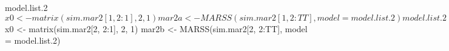 \begin{Schunk}
\begin{Sinput}
 model.list.2$x0 <- matrix(sim.mar2[1, 2:1], 2, 1)
 mar2a <- MARSS(sim.mar2[1, 2:TT], model = model.list.2)
 model.list.2$x0 <- matrix(sim.mar2[2, 2:1], 2, 1)
 mar2b <- MARSS(sim.mar2[2, 2:TT], model = model.list.2)
\end{Sinput}
\end{Schunk}
